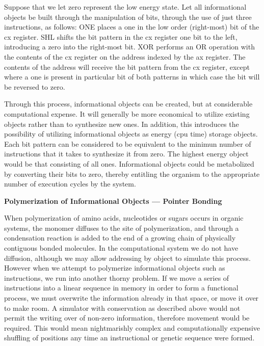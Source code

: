 Suppose that we let zero represent the low energy state.  Let all informational
objects be built through the manipulation of bits, through the use of just
three instructions, as follows:  ONE places a one in the low order
(right-most) bit of the cx register.  SHL shifts the bit pattern in the cx
register one bit to the left, introducing a zero into the right-most bit.
XOR performs an OR operation with the contents of the cx register on the
address indexed by the ax register.  The contents of the address will
receive the bit pattern from the cx register, except where a one is present
in particular bit of both patterns in which case the bit will be reversed
to zero.

Through this process, informational objects can be created, but at
considerable computational expense.  It will generally be more economical
to utilize existing objects rather than to synthesize new ones.  In addition,
this introduces the possibility of utilizing informational objects as
energy (cpu time) storage objects.  Each bit pattern can be considered to
be equivalent to the minimun number of instructions that it takes to
synthesize it from zero.  The highest energy object would be that consisting
of all ones.  Informational objects could be metabolized by converting their
bits to zero, thereby entitling the organism to the appropriate number of
execution cycles by the system.

\pagebreak

\LP
\bf Polymerization of Informational Objects --- Pointer Bonding\rm
\eLP

When polymerization of amino acids, nucleotides or sugars occurs in organic
systems, the monomer diffuses to the site of polymerization, and through
a condensation reaction is added to the end of a growing chain of physically
contiguous bonded molecules.  In the computational system we do not have
diffusion, although we may allow addressing by object to simulate this
process.  However when we attempt to polymerize informational objects such
as instructions, we run into another thorny problem.  If we move a series
of instructions into a linear sequence in memory in order to form a
functional process, we must overwrite the information already in that space,
or move it over to make room.  A simulator with conservation as described
above would not permit the writing over of non-zero information, therefore
movement would be required.  This would mean nightmarishly complex and
computationally expensive shuffling of positions any time an instructional
or genetic sequence were formed.

